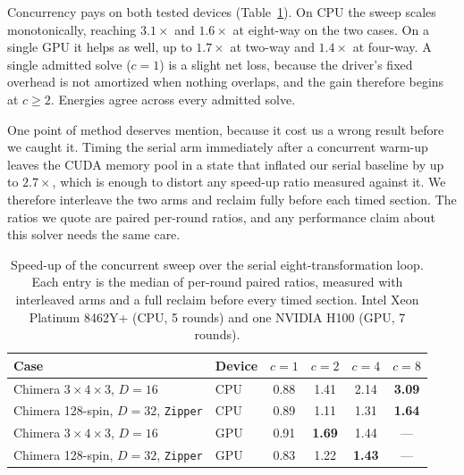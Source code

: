 \documentclass[preprint,12pt,a4paper]{elsarticle}
\begin{document}
Concurrency pays on both tested devices (Table~\ref{tab:sweep}). On CPU the sweep
scales monotonically, reaching $3.1\times$ and $1.6\times$ at eight-way on the two
cases. On a single GPU it helps as well, up to $1.7\times$ at two-way and
$1.4\times$ at four-way. A single admitted solve ($c{=}1$) is a slight net loss,
because the driver's fixed overhead is not amortized when nothing overlaps, and the
gain therefore begins at $c{\ge}2$. Energies agree across every admitted solve.

One point of method deserves mention, because it cost us a wrong result before we
caught it. Timing the serial arm immediately after a concurrent warm-up leaves the
CUDA memory pool in a state that inflated our serial baseline by up to $2.7\times$,
which is enough to distort any speed-up ratio measured against it. We therefore
interleave the two arms and reclaim fully before each timed section. The ratios we
quote are paired per-round ratios, and any performance claim about this solver needs
the same care.

\begin{table}[t]
\small
\centering
\caption{Speed-up of the concurrent sweep over the serial eight-transformation loop.
Each entry is the median of per-round paired ratios, measured with interleaved arms
and a full reclaim before every timed section. Intel Xeon Platinum 8462Y+ (CPU, 5
rounds) and one NVIDIA H100 (GPU, 7 rounds).}
\label{tab:sweep}
\begin{tabular}{@{}llcccc@{}}
\toprule
Case & Device & $c{=}1$ & $c{=}2$ & $c{=}4$ & $c{=}8$ \\
\midrule
Chimera $3\!\times\!4\!\times\!3$, $D{=}16$ & CPU & 0.88 & 1.41 & 2.14 & \textbf{3.09} \\
Chimera 128-spin, $D{=}32$, \texttt{Zipper} & CPU & 0.89 & 1.11 & 1.31 & \textbf{1.64} \\
Chimera $3\!\times\!4\!\times\!3$, $D{=}16$ & GPU & 0.91 & \textbf{1.69} & 1.44 & --- \\
Chimera 128-spin, $D{=}32$, \texttt{Zipper} & GPU & 0.83 & 1.22 & \textbf{1.43} & --- \\
\bottomrule
\end{tabular}
\end{table}
\end{document}

